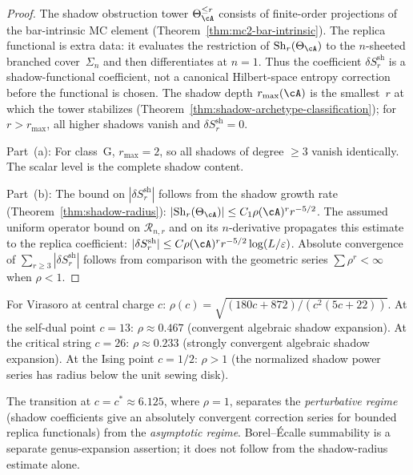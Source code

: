 \begin{proof}
The shadow obstruction tower $\Theta_\cA^{\le r}$ consists of
finite-order projections of the bar-intrinsic MC element
(Theorem~\ref{thm:mc2-bar-intrinsic}).  The replica functional is
extra data: it evaluates the restriction of
$\Sh_r(\Theta_\cA)$ to the $n$-sheeted branched cover~$\Sigma_n$ and
then differentiates at $n=1$.  Thus the coefficient
$\delta S_r^{\mathrm{sh}}$ is a shadow-functional coefficient, not a
canonical Hilbert-space entropy correction before the functional is
chosen.
The shadow depth $r_{\max}(\cA)$ is the
smallest~$r$ at which the tower stabilizes
(Theorem~\ref{thm:shadow-archetype-classification});
for~$r > r_{\max}$, all higher shadows vanish and
$\delta S_r^{\mathrm{sh}} = 0$.

Part~(a): For class~G, $r_{\max} = 2$, so all shadows of
degree $\ge 3$ vanish identically. The scalar
level is the complete shadow content.

Part~(b): The bound on $|\delta S_r^{\mathrm{sh}}|$ follows from the
shadow growth rate
(Theorem~\ref{thm:shadow-radius}):
$|\Sh_r(\Theta_\cA)| \le C_1 \rho(\cA)^r r^{-5/2}$.
The assumed uniform operator bound on $\mathcal R_{n,r}$ and on its
$n$-derivative propagates this estimate to the replica coefficient:
$|\delta S_r^{\mathrm{sh}}| \le C \rho(\cA)^r r^{-5/2}
\log(L/\varepsilon)$.
Absolute convergence of $\sum_{r \ge 3} |\delta S_r^{\mathrm{sh}}|$
follows from comparison with the geometric series
$\sum \rho^r < \infty$ when $\rho < 1$.
\end{proof}

\begin{remark}
\label{rem:ent-convergence-radius}
For Virasoro at central charge $c$:
$\rho(c) = \sqrt{(180c+872)/(c^2(5c+22))}$.
At the self-dual point $c = 13$: $\rho \approx 0.467$
(convergent algebraic shadow expansion).
At the critical string $c = 26$: $\rho \approx 0.233$
(strongly convergent algebraic shadow expansion).
At the Ising point $c = 1/2$: $\rho > 1$
(the normalized shadow power series has radius below the
unit sewing disk).

The transition at $c = c^* \approx 6.125$, where
$\rho = 1$, separates the \emph{perturbative regime}
(shadow coefficients give an absolutely convergent correction
series for bounded replica functionals) from the
\emph{asymptotic regime}.  Borel--\'Ecalle summability is a
separate genus-expansion assertion; it does not follow from the
shadow-radius estimate alone.
\end{remark}

